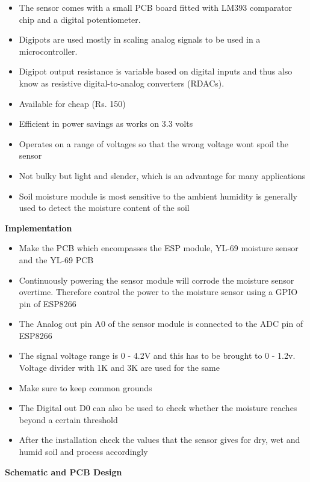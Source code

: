 \documentclass[16pt]{article}
\begin{document}
\begin{itemize}
\begin{itemize}
\item
  The sensor comes with a small PCB board fitted with LM393 comparator
  chip and a digital potentiometer.
\item
  Digipots are used mostly in scaling analog signals to be used in a
  microcontroller.
\item
  Digipot output resistance is variable based on digital inputs and thus
  also know as resistive digital-to-analog converters (RDACs).
\item
  Available for cheap (Rs. 150)
\item
  Efficient in power savings as works on 3.3 volts
\item
  Operates on a range of voltages so that the wrong voltage wont spoil
  the sensor
\item
  Not bulky but light and slender, which is an advantage for many
  applications
\item
  Soil moisture module is most sensitive to the ambient humidity is
  generally used to detect the \vspace{0.5cm}moisture content of the soil
\end{itemize}

{\Large{\textbf{Implementation}}}

\begin{itemize}

\item
  Make the PCB which encompasses the ESP module, YL-69 moisture sensor
  and the YL-69 PCB
\item
  Continuously powering the sensor module will corrode the moisture
  sensor overtime. Therefore control the power to the moisture sensor
  using a GPIO pin of ESP8266
\item
  The Analog out pin A0 of the sensor module is connected to the ADC pin
  of ESP8266
\item
  The signal voltage range is 0 - 4.2V and this has to be brought to 0 -
  1.2v. Voltage divider with 1K and 3K are used for the same
\item
  Make sure to keep common grounds
\item
  The Digital out D0 can also be used to check whether the moisture
  reaches beyond a certain threshold
\item
  After the installation check the values that the sensor gives for dry,
  wet and humid soil and process accordingly
\end{itemize}

\vspace{0.5cm}

{\Large{\item{\textbf{Schematic and PCB
Design}}}}

\end{itemize}
\end{document}
